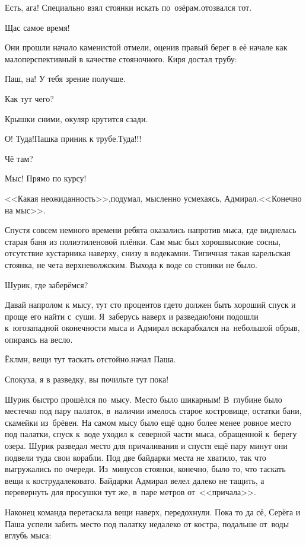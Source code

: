 \diagdash Есть, ага! Специально взял стоянки искать по~озёрам.\mdash отозвался тот.  

\diagdash Щас самое время!

Они прошли начало каменистой отмели, оценив правый берег в её начале как малоперспективный в качестве стояночного. Киря достал трубу:

\diagdash Паш, на! У тебя зрение получше.

\diagdash Как тут чего?

\diagdash Крышки сними, окуляр крутится сзади.

\diagdash О! Туда!\mdash Пашка приник к трубе.\mdash Туда!!!

\diagdash Чё там?

\diagdash Мыс! Прямо по курсу!

<<Какая неожиданность>>,\mdash подумал, мысленно усмехаясь, Адмирал.\mdash <<Конечно на мыс>>.

Спустя совсем немного времени ребята оказались напротив мыса, где виднелась старая баня из полиэтиленовой плёнки. Сам мыс был хорош\mdash высокие сосны, отсутствие кустарника наверху, снизу в воде\mdash камни. Типичная такая карельская стоянка, не чета верхневолжским. Выхода к воде со стоянки не было. 

\diagdash Шурик, где заберёмся?

\diagdash Давай напролом к мысу, тут сто процентов где\sdash то должен быть хороший спуск и проще его найти с~суши. Я~заберусь наверх и разведаю!\mdash они подошли к~юго\sdash западной оконечности мыса и Адмирал вскарабкался на~небольшой обрыв, опираясь на весло.

\diagdash Ёклмн, вещи тут таскать отстойно.\mdash начал Паша. 

\diagdash Спокуха, я в разведку, вы почильте тут пока! 

Шурик быстро прошёлся по~мысу. Место было шикарным! В~глубине было местечко под пару палаток, в~наличии имелось старое костровище, остатки бани, скамейки из~брёвен. На самом мысу было ещё одно более менее ровное место под палатки, спуск к~воде уходил к~северной части мыса, обращенной к~берегу озера. Шурик разведал место для причаливания и спустя ещё пару минут они подвели туда свои корабли. Под две байдарки места не хватило, так что выгружались по очереди. Из~минусов стоянки, конечно, было то, что таскать вещи к костру\mdash далековато. Байдарки Адмирал велел далеко не тащить, а перевернуть для просушки тут же, в~паре метров от~<<причала>>.

Наконец команда перетаскала вещи наверх, передохнули. Пока то да сё, Серёга и Паша успели забить место под палатку недалеко от костра, подальше от~воды вглубь мыса:

